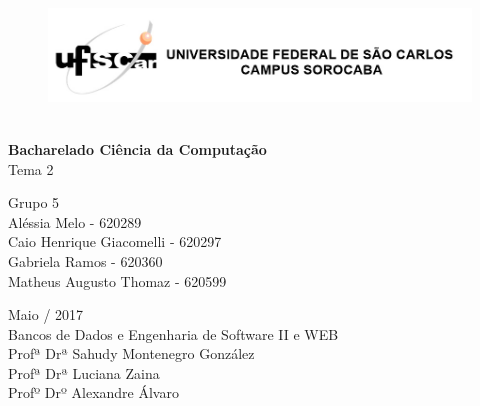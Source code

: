 \documentclass[
	12pt,				%
	oneside,			%
	a4paper,			%
	brazil				%
	]{abntex2}
\begin{document}

\frenchspacing 







\begin{center}

\begin{figure}[!htb]
\includegraphics[width=1.1\textwidth]{USFCAR_-_logo.jpg}\

\end{figure}


\vspace{80pt}
\LARGE{\textbf{Bacharelado Ciência da Computação}}\\
\LARGE{Tema 2}\\
\LARGE{ }

\vspace{50pt}
\textbf{\Huge{}}

\end{center}
	
\begin{flushleft}
		
\begin{center}
{\Large 	Grupo 5\\
			 Aléssia Melo - 620289\\
			 Caio Henrique Giacomelli - 620297\\
  			 Gabriela Ramos - 620360\\
  			 Matheus Augusto Thomaz - 620599\\}
\end{center}
        
\vspace{70pt}

 \begin{center}

{\large { Maio / 2017 \\Bancos de Dados e Engenharia de Software II e WEB } \\
Profª Drª Sahudy Montenegro González\\
Profª Drª Luciana Zaina \\
Profº Drº Alexandre Álvaro} 
                    
\end{center}
        
\end{flushleft}	
  
\end{document}
